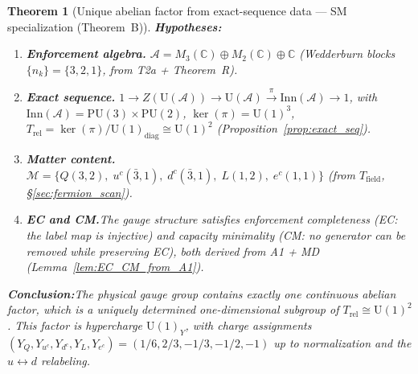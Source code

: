 \documentclass[11pt,a4paper]{article}
\newtheorem{theorem}{Theorem}[section]
\theoremstyle{definition}
\newcommand{\U}{\mathrm{U}}
\begin{document}
\begin{theorem}[Unique abelian factor from exact-sequence data ---
SM specialization (Theorem~B)]%
\label{thm:unique_U1_consolidated}
\textbf{Hypotheses:}
\begin{enumerate}[label=(H\arabic*),nosep]
  \item \textbf{Enforcement algebra.}\quad
  $\mathcal{A} = M_3(\mathbb{C}) \oplus M_2(\mathbb{C}) \oplus
  \mathbb{C}$ (Wedderburn blocks $\{n_k\} = \{3, 2, 1\}$, from
  T2a + Theorem~R).
  \item \textbf{Exact sequence.}\quad
  $1 \to Z(\mathrm{U}(\mathcal{A})) \to \mathrm{U}(\mathcal{A})
  \xrightarrow{\pi} \mathrm{Inn}(\mathcal{A}) \to 1$, with
  $\mathrm{Inn}(\mathcal{A}) = \mathrm{PU}(3) \times \mathrm{PU}(2)$,
  $\ker(\pi) = \mathrm{U}(1)^3$,
  $T_{\mathrm{rel}} = \ker(\pi) / \mathrm{U}(1)_{\mathrm{diag}}
  \cong \mathrm{U}(1)^2$
  (Proposition~\ref{prop:exact_seq}).
  \item \textbf{Matter content.}\quad
  $\mathcal{M} = \{Q(3,2),\; u^c(\bar{3},1),\; d^c(\bar{3},1),\;
  L(1,2),\; e^c(1,1)\}$ (from $T_{\mathrm{field}}$,
  \S\ref{sec:fermion_scan}).
  \item \textbf{EC and CM.}\quad The gauge structure satisfies
  enforcement completeness (EC: the label map is injective) and
  capacity minimality (CM: no generator can be removed while
  preserving EC), both derived from A1 + MD
  (Lemma~\ref{lem:EC_CM_from_A1}).
\end{enumerate}

\smallskip\noindent\textbf{Conclusion:}\quad The physical gauge group
contains exactly one continuous abelian factor, which is a uniquely
determined one-dimensional subgroup of $T_{\mathrm{rel}} \cong
\mathrm{U}(1)^2$.  This factor is hypercharge $\U(1)_Y$, with charge
assignments $(Y_Q, Y_{u^c}, Y_{d^c}, Y_L, Y_{e^c}) =
(1/6, 2/3, -1/3, -1/2, -1)$ up to normalization and the
$u \leftrightarrow d$ relabeling.
\end{theorem}
\end{document}
